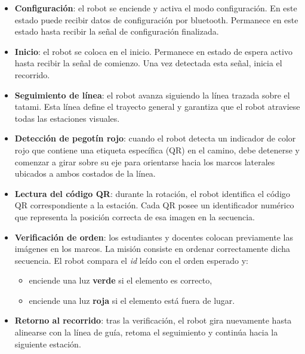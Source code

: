 \documentclass{prgrado}
\begin{document}
\begin{itemize}
    \item \textbf{Configuración}: el robot se enciende y activa el modo configuración. En este estado puede recibir datos de configuración por bluetooth. Permanece en este estado hasta recibir la señal de configuración finalizada.

    \item \textbf{Inicio}: el robot se coloca en el inicio. Permanece en estado de espera activo hasta recibir la señal de comienzo. Una vez detectada esta señal, inicia el recorrido.
    
    \item \textbf{Seguimiento de línea}: el robot avanza siguiendo la línea trazada sobre el tatami. Esta línea define el trayecto general y garantiza que el robot atraviese todas las estaciones visuales.
    
    \item \textbf{Detección de pegotín rojo}: cuando el robot detecta un indicador de color rojo que contiene una etiqueta específica (QR) en el camino, debe detenerse y comenzar a girar sobre su eje para orientarse hacia los marcos laterales ubicados a ambos costados de la línea.
    
    \item \textbf{Lectura del código QR}: durante la rotación, el robot identifica el código QR correspondiente a la estación. Cada QR posee un identificador numérico que representa la posición correcta de esa imagen en la secuencia.
    
    \item \textbf{Verificación de orden}: los estudiantes y docentes colocan previamente las imágenes en los marcos. La misión consiste en ordenar correctamente dicha secuencia. El robot compara el \emph{id} leído con el orden esperado y:
    \begin{itemize}
        \item enciende una luz \textbf{verde} si el elemento es correcto,
        \item enciende una luz \textbf{roja} si el elemento está fuera de lugar.
    \end{itemize}
    
    \item \textbf{Retorno al recorrido}: tras la verificación, el robot gira nuevamente hasta alinearse con la línea de guía, retoma el seguimiento y continúa hacia la siguiente estación.
    

\end{itemize}
\end{document}
